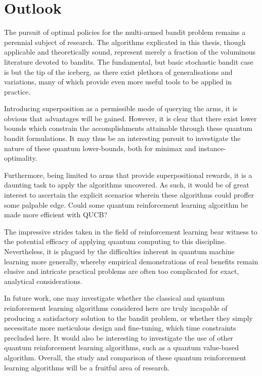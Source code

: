 \section{Outlook}
The pursuit of optimal policies for the multi-armed bandit problem remains a perennial subject of research.
The algorithms explicated in this thesis, though applicable and theoretically sound, represent merely a fraction of the voluminous literature devoted to bandits.
The fundamental, but basic stochastic bandit case is but the tip of the iceberg, as there exist plethora of generalisations and variations, many of which provide even more useful tools to be applied in practice.

Introducing superposition as a permissible mode of querying the arms, it is obvious that advantages will be gained.
However, it is clear that there exist lower bounds which constrain the accomplishments attainable through these quantum bandit formulations.
It may thus be an interesting pursuit to investigate the nature of these quantum lower-bounds, both for minimax and instance-optimality.

Furthermore, being limited to arms that provide superpositional rewards, it is a daunting task to apply the algorithms uncovered.
As such, it would be of great interest to ascertain the explicit scenarios wherein these algorithms could proffer some palpable edge.
Could some quantum reinforcement learning algorithm be made more efficient with QUCB?

The impressive strides taken in the field of reinforcement learning bear witness to the potential efficacy of applying quantum computing to this discipline.
Nevertheless, it is plagued by the difficulties inherent in quantum machine learning more generally, whereby empirical demonstrations of real benefits remain elusive and intricate practical problems are often too complicated for exact, analytical considerations.

In future work, one may investigate whether the classical and quantum reinforcement learning algorithms considered here are truly incapable of producing a satisfactory solution to the bandit problem, or whether they simply necessitate more meticulous design and fine-tuning, which time constraints precluded here.
It would also be interesting to investigate the use of other quantum reinforcement learning algorithms, such as a quantum value-based algorithm.
Overall, the study and comparison of these quantum reinforcement learning algorithms will be a fruitful area of research.
